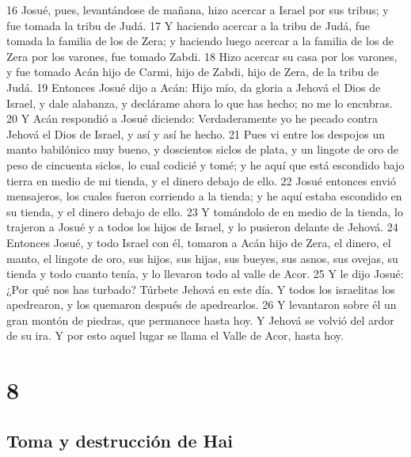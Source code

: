 16 Josué, pues, levantándose de mañana, hizo acercar a Israel por sus tribus; y fue tomada la tribu de Judá.
17 Y haciendo acercar a la tribu de Judá, fue tomada la familia de los de Zera; y haciendo luego acercar a la familia de los de Zera por los varones, fue tomado Zabdi.
18 Hizo acercar su casa por los varones, y fue tomado Acán hijo de Carmi, hijo de Zabdi, hijo de Zera, de la tribu de Judá.
19 Entonces Josué dijo a Acán: Hijo mío, da gloria a Jehová el Dios de Israel, y dale alabanza, y declárame ahora lo que has hecho; no me lo encubras.
20 Y Acán respondió a Josué diciendo: Verdaderamente yo he pecado contra Jehová el Dios de Israel, y así y así he hecho.
21 Pues vi entre los despojos un manto babilónico muy bueno, y doscientos siclos de plata,  y un lingote de oro de peso de cincuenta siclos, lo cual codicié y tomé; y he aquí que está escondido bajo tierra en medio de mi tienda, y el dinero debajo de ello.
22 Josué entonces envió mensajeros, los cuales fueron corriendo a la tienda; y he aquí estaba escondido en su tienda, y el dinero debajo de ello.
23 Y tomándolo de en medio de la tienda, lo trajeron a Josué y a todos los hijos de Israel, y lo pusieron delante de Jehová. 
24 Entonces Josué, y todo Israel con él, tomaron a Acán hijo de Zera, el dinero, el manto, el lingote de oro, sus hijos, sus hijas, sus bueyes, sus asnos, sus ovejas, su tienda y todo cuanto tenía, y lo llevaron todo al valle de Acor.
25 Y le dijo Josué: ¿Por qué nos has turbado? Túrbete Jehová en este día. Y todos los israelitas los apedrearon, y los quemaron después de apedrearlos.
26 Y levantaron sobre él un gran montón de piedras, que permanece hasta hoy. Y Jehová se volvió del ardor de su ira. Y por esto aquel lugar se llama el Valle de Acor, hasta hoy.

\chapter{8}

\section*{Toma y destrucción de Hai}


